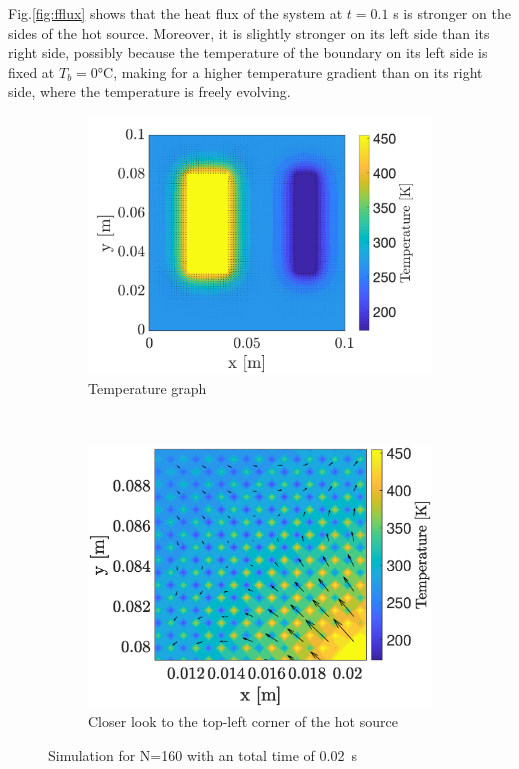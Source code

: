 \documentclass[a4paper,12pt,twoside]{article}
\begin{document}
Fig.\ref{fig:fflux} shows that the heat flux of the system at $t=0.1$ s is stronger on the sides of the hot source. Moreover, it is slightly stronger on its left side than its right side, possibly because the temperature of the boundary on its left side is fixed at $T_b=0$°C, making for a higher temperature gradient than on its right side, where the temperature is freely evolving.

\begin{figure}[h]
  \centering
  \begin{subfigure}[t]{0.45\textwidth}
    \centering
    \includegraphics[width=\textwidth]{graphs/f1_temp.png}
    \caption{Temperature graph}
    \label{fig:fac1-temp}
  \end{subfigure}
  ~
  \begin{subfigure}[t]{0.45\textwidth}
    \centering
    \includegraphics[width=\textwidth]{graphs/f1_temp_close.eps}
    \caption{Closer look to the top-left corner of the hot source}
    \label{fig:fac1-temp-close}
  \end{subfigure}
  \caption{Simulation for N=160 with an total time of \SI{0.02}{\s}}
  \label{fig:fac1}
\end{figure}
\end{document}
